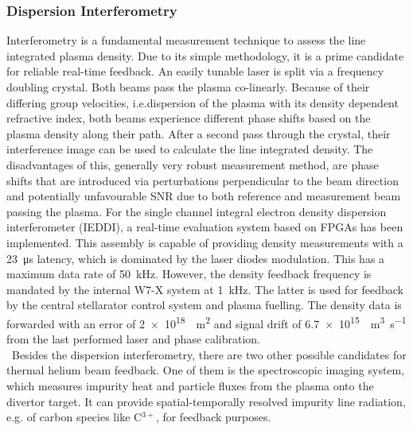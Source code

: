         \subsubsection*{Dispersion Interferometry}%
%
            Interferometry is a fundamental measurement technique to assess the line integrated plasma density. Due to its simple methodology, it is a prime candidate for reliable real-time feedback\cite{Mlynek2010,Boboc2012}. An easily tunable laser is split via a frequency doubling crystal. Both beams pass the plasma co-linearly. Because of their differing group velocities, i.e.dispersion of the plasma with its density dependent refractive index, both beams experience different phase shifts based on the plasma density along their path. After a second pass through the crystal, their interference image can be used to calculate the line integrated density. The disadvantages of this, generally very robust measurement method, are phase shifts that are introduced via perturbations perpendicular to the beam direction and potentially unfavourable SNR due to both reference and measurement beam passing the plasma\cite{Knauer2016}. For the single channel integral electron density dispersion interferometer (IEDDI), a real-time evaluation system based on FPGAs has been implemented. This assembly is capable of providing density measurements with a \SI{23}{\micro\second} latency, which is dominated by the laser diodes modulation. This has a maximum data rate of \SI{50}{\kilo\hertz}. However, the density feedback frequency is mandated by the internal W7-X system at \SI{1}{\kilo\hertz}. The latter is used for feedback by the central stellarator control system and plasma fuelling\cite{Spring2017}. The density data is forwarded with an error of \SI{2e18}{\per\square\meter} and signal drift of \SI{6.7e15}{\per\cubic\meter\per\second} from the last performed laser and phase calibration\cite{Brunner2018}.\\%

        \,\newline%
        Besides the dispersion interferometry, there are two other possible candidates for thermal helium beam feedback. One of them is the spectroscopic imaging system, which measures impurity heat and particle fluxes from the plasma onto the divertor target. It can provide spatial-temporally resolved impurity line radiation, e.g. of carbon species like C$^{3+}$, for feedback purposes.%
%
